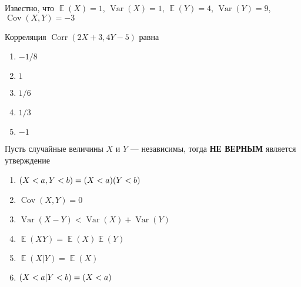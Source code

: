 \documentclass[t]{beamer}
\DeclareMathOperator{\Var}{Var}
\DeclareMathOperator{\Cov}{Cov}
\DeclareMathOperator{\Corr}{Corr}
\DeclareMathOperator{\E}{\mathbb{E}}
\let\P\relax
\DeclareMathOperator{\P}{\mathbb{P}}
\begin{document}
 \begin{frame} \label{25} 
\begin{block}{25} 

Известно, что $\E(X)=1$, $\Var(X)=1$, $\E(Y)=4$, $\Var(Y)=9$, $\Cov(X,Y)=-3$

\vspace{0.5cm} 
 
 
Корреляция $\Corr(2X+3,4Y-5)$ равна
 


 \end{block} 
\begin{enumerate} 
\item[] \hyperlink{25-No}{\beamergotobutton{} $-1/8$}
\item[] \hyperlink{25-No}{\beamergotobutton{} $1$}
\item[] \hyperlink{25-No}{\beamergotobutton{} $1/6$
}
\item[] \hyperlink{25-No}{\beamergotobutton{} $1/3$}
\item[] \hyperlink{25-Yes}{\beamergotobutton{} $-1$}
\end{enumerate} 
\end{frame} 


 \begin{frame} \label{26} 
\begin{block}{26} 

Пусть случайные величины $X$ и $Y$ — независимы, тогда \textbf{НЕ ВЕРНЫМ} является утверждение
 


 \end{block} 
\begin{enumerate} 
\item[] \hyperlink{26-No}{\beamergotobutton{} $\P(X<a, Y<b)=\P(X<a)\P(Y<b)$}
\item[] \hyperlink{26-No}{\beamergotobutton{} $\Cov(X,Y) = 0$}
\item[] \hyperlink{26-Yes}{\beamergotobutton{} $\Var(X-Y)<\Var(X)+\Var(Y)$ }
\item[] \hyperlink{26-No}{\beamergotobutton{} $\E(XY)=\E(X)\E(Y)$}
\item[] \hyperlink{26-No}{\beamergotobutton{} $\E(X|Y)=\E(X)$}
\item[] \hyperlink{26-No}{\beamergotobutton{} $\P(X<a | Y<b)=\P(X<a)$}
\end{enumerate} 
\end{frame} 
\end{document}
